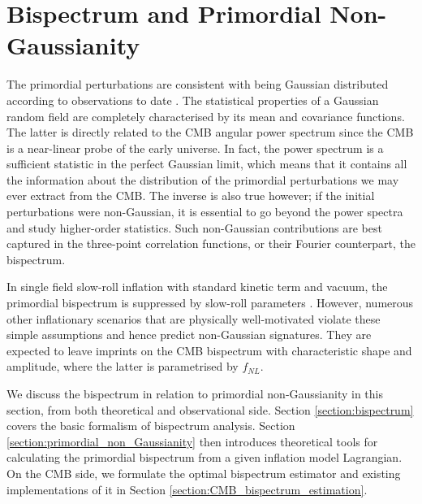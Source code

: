 \chapter{Bispectrum and Primordial Non-Gaussianity}

\ifpdf
    \graphicspath{{Chapter3/Figs/Raster/}{Chapter3/Figs/PDF/}{Chapter3/Figs/}}
\else
    \graphicspath{{Chapter3/Figs/Vector/}{Chapter3/Figs/}}
\fi

The primordial perturbations are consistent with being Gaussian distributed according to observations to date \cite{PlanckCollaboration2018}. The statistical properties of a Gaussian random field are completely characterised by its mean and covariance functions. The latter is directly related to the CMB angular power spectrum since the CMB is a near-linear probe of the early universe. In fact, the power spectrum is a sufficient statistic in the perfect Gaussian limit, which means that it contains all the information about the distribution of the primordial perturbations we may ever extract from the CMB. The inverse is also true however; if the initial perturbations were non-Gaussian, it is essential to go beyond the power spectra and study higher-order statistics. Such non-Gaussian contributions are best captured in the three-point correlation functions, or their Fourier counterpart, the bispectrum.

In single field slow-roll inflation with standard kinetic term and vacuum, the primordial bispectrum is suppressed by slow-roll parameters \cite{Maldacena2013}. However, numerous other inflationary scenarios that are physically well-motivated violate these simple assumptions and hence predict non-Gaussian signatures. They are expected to leave imprints on the CMB bispectrum with characteristic shape and amplitude, where the latter is parametrised by $f_{NL}$.

We discuss the bispectrum in relation to primordial non-Gaussianity in this section, from both theoretical and observational side. Section \ref{section:bispectrum} covers the basic formalism of bispectrum analysis. Section \ref{section:primordial_non_Gaussianity} then introduces theoretical tools for calculating the primordial bispectrum from a given inflation model Lagrangian. On the CMB side, we formulate the optimal bispectrum estimator and existing implementations of it in Section \ref{section:CMB_bispectrum_estimation}.


